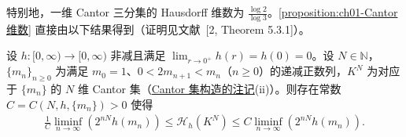 \documentclass[../../main.tex]{subfiles}%
\begin{document}
特别地，一维 Cantor 三分集的 Hausdorff 维数为 $\frac{\log2}{\log3}$。\cref{proposition:ch01-Cantor维数} 直接由以下结果得到（证明见文献~[2, Theorem 5.3.1]）。

\begin{theorem}\label{theorem:ch01-Cantor测度估计}
设 $h:[0,\infty)\to[0,\infty)$ 非减且满足 $\lim_{r\to0^+}h(r)=h(0)=0$。设 $N\in\mathbb{N}$，$\{m_n\}_{n\geqslant0}$ 为满足 $m_0=1$、$0<2m_{n+1}<m_n$（$n\geqslant0$）的递减正数列，$K^N$ 为对应于 $\{m_n\}$ 的 $N$ 维 Cantor 集（\hyperref[remark:ch01-Cantor-Vitali]{Cantor 集构造的注记}(ii)）。则存在常数 $C=C(N,h,\{m_n\})>0$ 使得
\begin{align}
\frac{1}{C}\liminf_{n\to\infty}\left(2^{nN}h(m_n)\right)\leqslant\mathcal{H}_h(K^N)\leqslant C\liminf_{n\to\infty}\left(2^{nN}h(m_n)\right). \label{align:ch01-Cantor估计}
\end{align}
\end{theorem}
\end{document}
